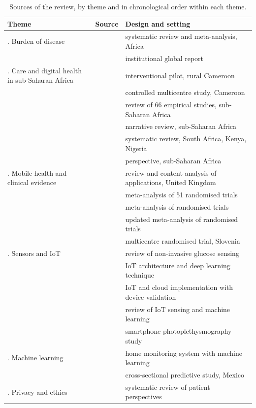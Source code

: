 \documentclass[12pt,a4paper,oneside]{report}
\begin{document}
\begin{table}[htbp]
\centering\footnotesize
\caption{Sources of the review, by theme and in chronological order within each theme.}\label{tab:lr-overview}
\begin{tabularx}{\textwidth}{@{}>{\raggedright\arraybackslash}p{3.4cm} >{\raggedright\arraybackslash}p{3.9cm} >{\raggedright\arraybackslash}X@{}}
\toprule
\textbf{Theme} & \textbf{Source} & \textbf{Design and setting} \\
\midrule
1. Burden of disease & \textcite{hinneh2023} & systematic review and meta-analysis, Africa \\
 & \textcite{who2023hypertension} & institutional global report \\
\addlinespace
2. Care and digital health in sub-Saharan Africa & \textcite{kingue2013} & interventional pilot, rural Cameroon \\
 & \textcite{bediang2021} & controlled multicentre study, Cameroon \\
 & \textcite{dodoo2022} & review of 66 empirical studies, sub-Saharan Africa \\
 & \textcite{gafane2024} & narrative review, sub-Saharan Africa \\
 & \textcite{agbeyangi2025} & systematic review, South Africa, Kenya, Nigeria \\
 & \textcite{segun2025} & perspective, sub-Saharan Africa \\
\addlinespace
3. Mobile health and clinical evidence & \textcite{alessa2019} & review and content analysis of applications, United Kingdom \\
 & \textcite{mao2020} & meta-analysis of 51 randomised trials \\
 & \textcite{zhou2024} & meta-analysis of randomised trials \\
 & \textcite{bandeira2024} & updated meta-analysis of randomised trials \\
 & \textcite{mihevc2025} & multicentre randomised trial, Slovenia \\
\addlinespace
4. Sensors and IoT & \textcite{alhaddad2022} & review of non-invasive glucose sensing \\
 & \textcite{tai2024} & IoT architecture and deep learning technique \\
 & \textcite{efendi2025} & IoT and cloud implementation with device validation \\
 & \textcite{liu2025review} & review of IoT sensing and machine learning \\
 & \textcite{liu2025ppg} & smartphone photoplethysmography study \\
\addlinespace
5. Machine learning & \textcite{chatrati2022} & home monitoring system with machine learning \\
 & \textcite{mendoza2025} & cross-sectional predictive study, Mexico \\
\addlinespace
6. Privacy and ethics & \textcite{alhammad2024} & systematic review of patient perspectives \\
\bottomrule
\end{tabularx}
\end{table}
\end{document}

